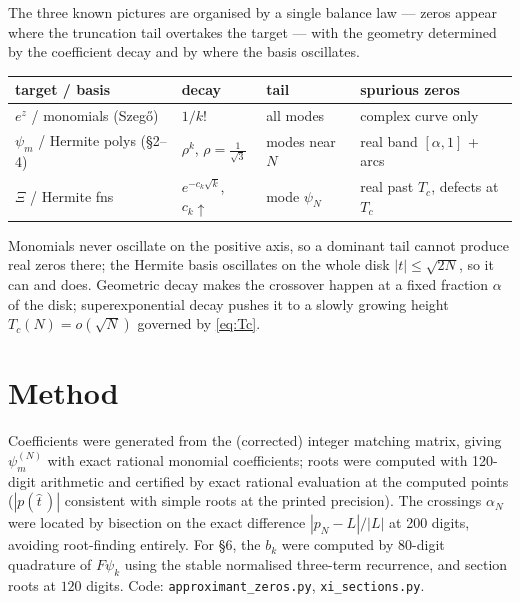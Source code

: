 \documentclass[11pt]{article}
\theoremstyle{remark}
\begin{document}
The three known pictures are organised by a single balance law --- zeros appear where the truncation tail overtakes the target --- with the geometry determined by the coefficient decay and by where the basis oscillates.

\begin{center}
\begin{tabular}{@{}llll@{}}
\toprule
target / basis & decay & tail & spurious zeros \\
\midrule
$e^z$ / monomials (Szeg\H{o}) & $1/k!$ & all modes & complex curve only \\
$\psi_m$ / Hermite polys (\S2--4) & $\rho^k$, $\rho = \tfrac{1}{\sqrt3}$ & modes near $N$ & real band $[\alpha, 1]$ + arcs \\
$\Xi$ / Hermite fns & $e^{-c_k\sqrt{k}}$, $c_k \uparrow$ & mode $\psi_N$ & real past $T_c$, defects at $T_c$ \\
\bottomrule
\end{tabular}
\end{center}

Monomials never oscillate on the positive axis, so a dominant tail cannot produce real zeros there; the Hermite basis oscillates on the whole disk $|t| \le \sqrt{2N}$, so it can and does. Geometric decay makes the crossover happen at a fixed fraction $\alpha$ of the disk; superexponential decay pushes it to a slowly growing height $T_c(N) = o(\sqrt{N})$ governed by \eqref{eq:Tc}.

\section{Method}

Coefficients were generated from the (corrected) integer matching matrix, giving $\psi_m^{(N)}$ with exact rational monomial coefficients; roots were computed with 120-digit arithmetic and certified by exact rational evaluation at the computed points ($|p(\hat t\,)|$ consistent with simple roots at the printed precision). The crossings $\alpha_N$ were located by bisection on the exact difference $|p_N - L|/|L|$ at 200 digits, avoiding root-finding entirely. For \S6, the $b_k$ were computed by $80$-digit quadrature of $F \psi_k$ using the stable normalised three-term recurrence, and section roots at $120$ digits. Code: \texttt{approximant\_zeros.py}, \texttt{xi\_sections.py}.
\end{document}
